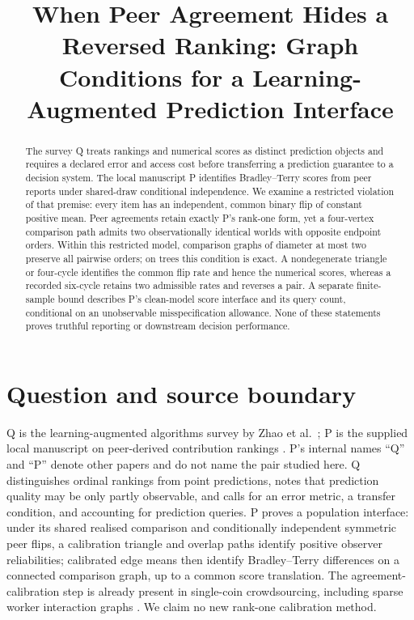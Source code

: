 \documentclass{article}
\title{When Peer Agreement Hides a Reversed Ranking: Graph Conditions for a Learning-Augmented Prediction Interface}
\begin{document}
\maketitle

\begin{abstract}
The survey Q treats rankings and numerical scores as distinct prediction objects and requires a
declared error and access cost before transferring a prediction guarantee to a decision system. The
local manuscript P identifies Bradley--Terry scores from peer reports under shared-draw conditional
independence. %
We examine a restricted violation of that premise: every item has an independent, common binary flip
of constant positive mean. Peer agreements retain exactly P's rank-one form, yet a four-vertex
comparison path admits two observationally identical worlds with opposite endpoint orders. %
Within this restricted model, comparison graphs of diameter at most two preserve all pairwise
orders; on trees this condition is exact. A nondegenerate triangle or four-cycle identifies the
common flip rate and hence the numerical scores, whereas a recorded six-cycle retains two admissible
rates and reverses a pair. %
A separate finite-sample bound describes P's clean-model score interface and its query count,
conditional on an unobservable misspecification allowance. None of these statements proves truthful
reporting or downstream decision performance. %
\end{abstract}

\section{Question and source boundary}
Q is the learning-augmented algorithms survey by Zhao et al.\ \cite{Q}; P is the supplied local
manuscript on peer-derived contribution rankings \cite{P}. P's internal names ``Q'' and ``P'' denote
other papers and do not name the pair studied here. %
Q distinguishes ordinal rankings from point predictions, notes that prediction quality may be only
partly observable, and calls for an error metric, a transfer condition, and accounting for
prediction queries. %
P proves a population interface: under its shared realised comparison and conditionally independent
symmetric peer flips, a calibration triangle and overlap paths identify positive observer
reliabilities; calibrated edge means then identify Bradley--Terry differences on a connected
comparison graph, up to a common score translation. %
The agreement-calibration step is already present in single-coin crowdsourcing, including sparse
worker interaction graphs \cite{Ma2017}. We claim no new rank-one calibration method. %
\end{document}
